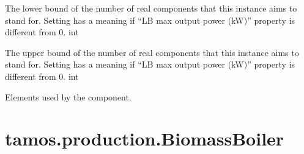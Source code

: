 \documentclass[letterpaper,10pt,english]{sphinxmanual}
\begin{document}
\begin{fulllineitems}
\begin{fulllineitems}
\label{\detokenize{generated/tamos.production.AbsHP:tamos.production.AbsHP.units_number_lb}}
\pysigstartsignatures
{}
\pysigstopsignatures
\sphinxAtStartPar
The lower bound of the number of real components that this instance aims to stand for.
Setting  has a meaning if “LB max output power (kW)” property is different from 0.
int

\end{fulllineitems}


\begin{fulllineitems}
\label{\detokenize{generated/tamos.production.AbsHP:tamos.production.AbsHP.units_number_ub}}
\pysigstartsignatures
{}
\pysigstopsignatures
\sphinxAtStartPar
The upper bound of the number of real components that this instance aims to stand for.
Setting  has a meaning if “LB max output power (kW)” property is different from 0.
int

\end{fulllineitems}


\begin{fulllineitems}
\label{\detokenize{generated/tamos.production.AbsHP:tamos.production.AbsHP.used_elements}}
\pysigstartsignatures
{}
\pysigstopsignatures
\sphinxAtStartPar
Elements used by the component.

\end{fulllineitems}


\end{fulllineitems}


\sphinxstepscope


\section{tamos.production.BiomassBoiler}
\label{\detokenize{generated/tamos.production.BiomassBoiler:tamos-production-biomassboiler}}\label{\detokenize{generated/tamos.production.BiomassBoiler::doc}}
\end{document}
